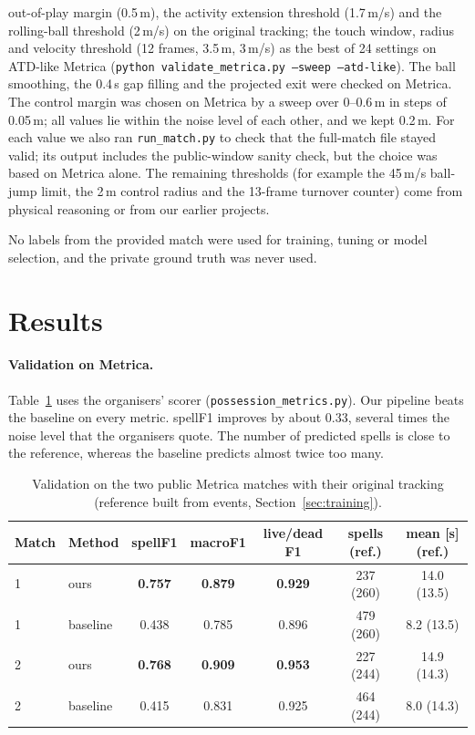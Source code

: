 \documentclass[11pt,a4paper]{article}
\newcommand{\code}[1]{\texttt{#1}}
\begin{document}
\begin{itemize}
    out-of-play margin (0.5\,m), the activity extension threshold (1.7\,m/s) and the rolling-ball threshold
    (2\,m/s) on the original tracking; the touch window, radius and velocity threshold (12 frames, 3.5\,m, 3\,m/s) as
    the best of 24 settings on ATD-like Metrica (\code{python validate\_metrica.py --sweep --atd-like}). The ball
    smoothing, the 0.4\,s gap filling and the projected exit were checked on Metrica. The control margin was chosen on
    Metrica by a sweep over 0--0.6\,m in steps of 0.05\,m; all values lie within the noise level of each other, and we
    kept 0.2\,m. For each value we also ran \code{run\_match.py} to check that the full-match file stayed valid; its
    output includes the public-window sanity check, but the choice was based on Metrica alone. The remaining
    thresholds (for example the 45\,m/s ball-jump limit, the 2\,m control radius and the 13-frame turnover counter)
    come from physical reasoning or from our earlier projects.
\end{itemize}
No labels from the provided match were used for training, tuning or model selection, and the private ground truth
was never used.

\section{Results}
\label{sec:results}

\paragraph{Validation on Metrica.}
Table~\ref{tab:metrica} uses the organisers' scorer (\code{possession\_metrics.py}). Our pipeline beats the baseline
on every metric. spellF1 improves by about 0.33, several times the noise level that the organisers quote. The number
of predicted spells is close to the reference, whereas the baseline predicts almost twice too many.

\begin{table}[ht]
\centering
\small
\caption{Validation on the two public Metrica matches with their original tracking (reference built from events,
Section~\ref{sec:training}).}
\label{tab:metrica}
{\renewcommand{\arraystretch}{1.25}
\begin{tabular}{|l|l|c|c|c|c|c|}
\hline
\textbf{Match} & \textbf{Method} & \textbf{spellF1} & \textbf{macroF1} & \textbf{live/dead F1} & \textbf{spells (ref.)} & \textbf{mean [s] (ref.)} \\
\hline
1 & ours     & \textbf{0.757} & \textbf{0.879} & \textbf{0.929} & 237 (260) & 14.0 (13.5) \\
\hline
1 & baseline & 0.438 & 0.785 & 0.896 & 479 (260) & 8.2 (13.5) \\
\hline
2 & ours     & \textbf{0.768} & \textbf{0.909} & \textbf{0.953} & 227 (244) & 14.9 (14.3) \\
\hline
2 & baseline & 0.415 & 0.831 & 0.925 & 464 (244) & 8.0 (14.3) \\
\hline
\end{tabular}}
\end{table}
\end{document}
